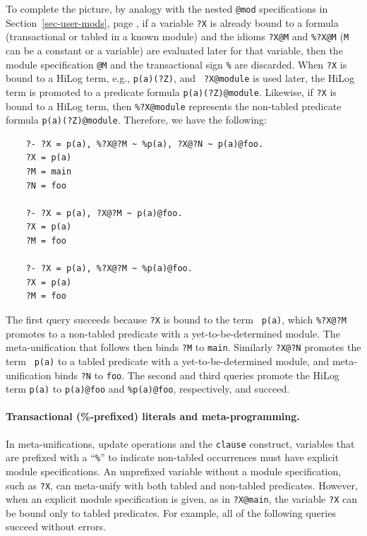 \documentclass[11pt]{article}
\begin{document}
To complete the picture, by analogy with the nested \texttt{@mod}  specifications
in Section~\ref{sec-user-mods}, page
\pageref{pg-nested-module}, if a variable
\texttt{?X} is already bound to a
formula (transactional or tabled in a known module) and the idioms 
\texttt{?X@M} and \texttt{\%?X@M} (\texttt{M} can be a constant or a variable)
are evaluated later for that variable,  
then the module specification \texttt{@M}  and the transactional sign
\texttt{\%} are discarded. 
When {\tt ?X} is bound to a HiLog term, e.g., {\tt p(a)(?Z)}, and {\tt
  ?X@module} is used later, the HiLog term is promoted to a predicate
formula {\tt p(a)(?Z)@module}.
Likewise, if {\tt ?X} is bound to a HiLog term, then {\tt \%?X@module}
  represents the non-tabled predicate formula {\tt p(a)(?Z)@module}.
Therefore, we have the following:
\begin{verbatim}
    ?- ?X = p(a), %?X@?M ~ %p(a), ?X@?N ~ p(a)@foo.
    ?X = p(a)
    ?M = main
    ?N = foo
    
    ?- ?X = p(a), ?X@?M ~ p(a)@foo.
    ?X = p(a)
    ?M = foo

    ?- ?X = p(a), %?X@?M ~ %p(a)@foo. 
    ?X = p(a)
    ?M = foo

\end{verbatim}
The first query succeeds because {\tt ?X} is bound to the term {\tt
p(a)}, which {\tt \%?X@?M} promotes to a non-tabled predicate with
a yet-to-be-determined module.  The meta-unification that follows then
binds {\tt ?M} to {\tt main}. Similarly {\tt ?X@?N} promotes the term {\tt
p(a)} to a tabled predicate with a yet-to-be-determined module, and
meta-unification binds {\tt ?N} to {\tt foo}. The second and third queries
promote the HiLog term \texttt{p(a)} to \texttt{p(a)@foo} and
\texttt{\%p(a)@foo}, respectively, and succeed.


\paragraph{Transactional (\%-prefixed) literals and meta-programming.}
In meta-unifications, update operations and the {\tt clause} construct,
variables that are prefixed with a ``{\tt \%}'' to indicate non-tabled
occurrences must have explicit module specifications. An unprefixed
variable without a module specification, such as {\tt ?X}, can meta-unify
with both tabled and non-tabled predicates.  However, when an explicit
module specification is given, as in {\tt ?X@main}, the variable
\texttt{?X} can be bound only to tabled predicates. For example,
all of the following queries succeed without errors.
\end{document}
